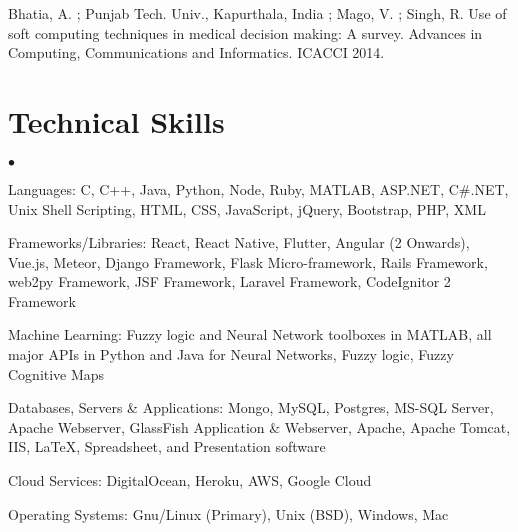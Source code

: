 \documentclass[margin,line]{res}
\newenvironment{list2}{
  \begin{list}{$\bullet$}{%
      \setlength{\itemsep}{0in}
      \setlength{\parsep}{0in} \setlength{\parskip}{0in}
      \setlength{\topsep}{0in} \setlength{\partopsep}{0in}
      \setlength{\leftmargin}{0.2in}}}{\end{list}}
\begin{document}
\begin{resume}
Bhatia, A. ; Punjab Tech. Univ., Kapurthala, India ; Mago, V. ; Singh, R. Use of soft computing techniques in medical decision making: A survey. Advances in Computing, Communications and Informatics. ICACCI 2014.  


\section{\sc Technical Skills}
\begin{list2}
\item Languages:  C, C++, Java, Python, Node, Ruby, MATLAB, ASP.NET, C\#.NET, Unix Shell Scripting, HTML, CSS, JavaScript, jQuery, Bootstrap, PHP, XML\\
\item Frameworks/Libraries: React, React Native, Flutter, Angular (2 Onwards), Vue.js, Meteor, Django Framework, Flask Micro-framework, Rails Framework, web2py Framework, JSF Framework, Laravel Framework, CodeIgnitor 2 Framework\\
\item Machine Learning: Fuzzy logic and Neural Network toolboxes in MATLAB, all major APIs in Python and Java for Neural Networks, Fuzzy logic, Fuzzy Cognitive Maps  
\item Databases, Servers \& Applications: Mongo, MySQL, Postgres, MS-SQL Server, Apache Webserver, GlassFish Application \& Webserver, Apache, Apache Tomcat, IIS, \LaTeX, Spreadsheet, and Presentation software\\
\item Cloud Services: DigitalOcean, Heroku, AWS, Google Cloud\\
\item Operating Systems:  Gnu/Linux (Primary), Unix (BSD), Windows, Mac\\
\end{list2}

\end{resume}
\end{document}
